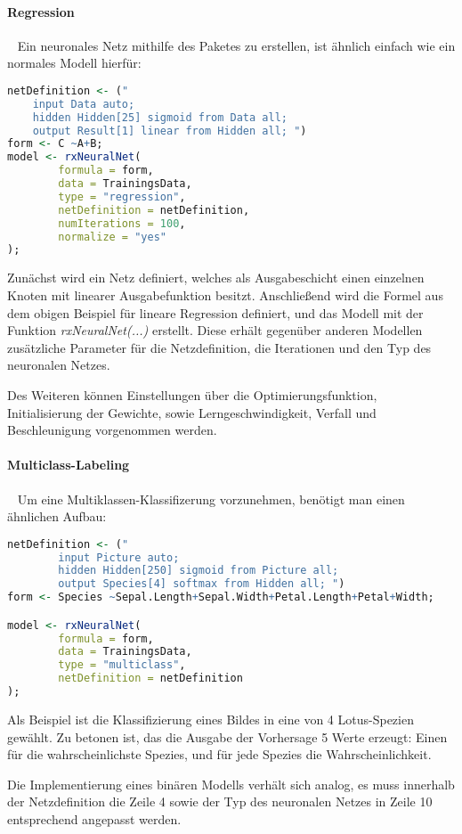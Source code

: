 \paragraph{Regression} ~\newline
Ein neuronales Netz mithilfe des Paketes zu erstellen, ist ähnlich einfach wie ein normales Modell hierfür:

\begin{lstlisting}[language=R]
netDefinition <- ("
	input Data auto;
	hidden Hidden[25] sigmoid from Data all;
	output Result[1] linear from Hidden all; ")
form <- C ~A+B;
model <- rxNeuralNet(
		formula = form, 
		data = TrainingsData,              
		type = "regression",
		netDefinition = netDefinition,
		numIterations = 100,
		normalize = "yes"
);
\end{lstlisting}

Zunächst wird ein Netz definiert, welches als Ausgabeschicht einen einzelnen Knoten mit linearer Ausgabefunktion besitzt. Anschließend wird die Formel aus dem obigen Beispiel für lineare Regression definiert, und das Modell mit der Funktion \textit{rxNeuralNet(...)} erstellt. Diese erhält gegenüber anderen Modellen zusätzliche Parameter für die Netzdefinition, die Iterationen und den Typ des neuronalen Netzes. 

Des Weiteren können Einstellungen über die Optimierungsfunktion, Initialisierung der Gewichte, sowie Lerngeschwindigkeit, Verfall und Beschleunigung vorgenommen werden.
\newpage
\paragraph{Multiclass-Labeling} ~\newline
Um eine Multiklassen-Klassifizerung vorzunehmen, benötigt man einen ähnlichen Aufbau:


\begin{lstlisting}[language=R]
netDefinition <- ("
		input Picture auto;
		hidden Hidden[250] sigmoid from Picture all;
		output Species[4] softmax from Hidden all; ")
form <- Species ~Sepal.Length+Sepal.Width+Petal.Length+Petal+Width;

model <- rxNeuralNet(
		formula = form, 
		data = TrainingsData,              
		type = "multiclass",
		netDefinition = netDefinition
);
\end{lstlisting}

Als Beispiel ist die Klassifizierung eines Bildes in eine von 4 Lotus-Spezien gewählt. Zu betonen ist, das die Ausgabe der Vorhersage 5 Werte erzeugt: Einen für die wahrscheinlichste Spezies, und für jede Spezies die Wahrscheinlichkeit. 

Die Implementierung eines binären Modells verhält sich analog, es muss innerhalb der Netzdefinition die Zeile 4 sowie der Typ des neuronalen Netzes in Zeile 10 entsprechend angepasst werden.